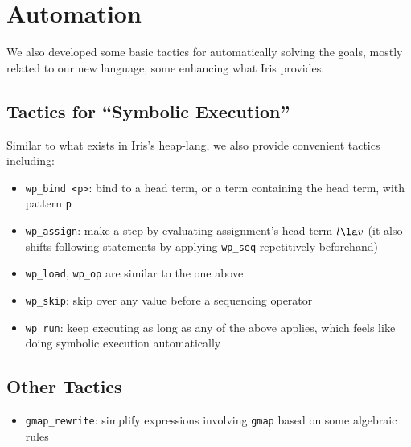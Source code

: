 \section{Automation}
\label{sec:auto}

We also developed some basic tactics for automatically solving the goals,
mostly related to our new language, some enhancing what Iris provides.

\subsection{Tactics for ``Symbolic Execution''}

Similar to what exists in Iris's heap-lang, we also provide convenient tactics
including:

\begin{itemize}
    \item \texttt{wp\_bind <p>}: bind to a head term, or a term containing the head term, with pattern \texttt{p}
    \item \texttt{wp\_assign}: make a step by evaluating assignment's head term $l \la v$
        (it also shifts following statements by applying \texttt{wp\_seq} repetitively beforehand)
    \item \texttt{wp\_load}, \texttt{wp\_op} are similar to the one above
    \item \texttt{wp\_skip}: skip over any value before a sequencing operator
    \item \texttt{wp\_run}: keep executing as long as any of the above applies, which feels like doing
        symbolic execution automatically
\end{itemize}

\subsection{Other Tactics}

\begin{itemize}
    \item \texttt{gmap\_rewrite}: simplify expressions involving \texttt{gmap} based on some algebraic rules
\end{itemize}
